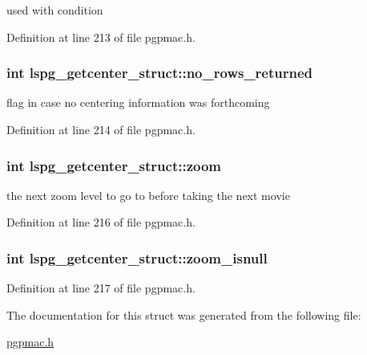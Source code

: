 used with condition 



Definition at line 213 of file pgpmac.\-h.

\hypertarget{structlspg__getcenter__struct_aaeb0ccf4289b4fb306c2bc04ae85b237}{
\subsubsection[{no\-\_\-rows\-\_\-returned}]{\setlength{\rightskip}{0pt plus 5cm}int lspg\-\_\-getcenter\-\_\-struct\-::no\-\_\-rows\-\_\-returned}}\label{structlspg__getcenter__struct_aaeb0ccf4289b4fb306c2bc04ae85b237}


flag in case no centering information was forthcoming 



Definition at line 214 of file pgpmac.\-h.

\hypertarget{structlspg__getcenter__struct_a63e640a925611d2404a1529aea30a853}{
\subsubsection[{zoom}]{\setlength{\rightskip}{0pt plus 5cm}int lspg\-\_\-getcenter\-\_\-struct\-::zoom}}\label{structlspg__getcenter__struct_a63e640a925611d2404a1529aea30a853}


the next zoom level to go to before taking the next movie 



Definition at line 216 of file pgpmac.\-h.

\hypertarget{structlspg__getcenter__struct_a6ca85a8de29039188357b2814acd7803}{
\subsubsection[{zoom\-\_\-isnull}]{\setlength{\rightskip}{0pt plus 5cm}int lspg\-\_\-getcenter\-\_\-struct\-::zoom\-\_\-isnull}}\label{structlspg__getcenter__struct_a6ca85a8de29039188357b2814acd7803}


Definition at line 217 of file pgpmac.\-h.



The documentation for this struct was generated from the following file\-:\begin{DoxyCompactItemize}
\item 
\hyperlink{pgpmac_8h}{pgpmac.\-h}\end{DoxyCompactItemize}
